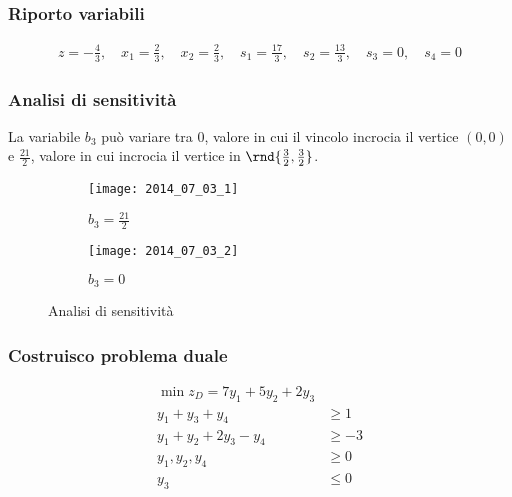 \documentclass[\main/main.tex]{subfiles}
\begin{document}
\subsubsection*{Riporto variabili}

\begin{align*}
  z = -\frac{4}{3}, \quad
  x_1 = \frac{2}{3}, \quad
  x_2 = \frac{2}{3}, \quad
  s_1 = \frac{17}{3}, \quad
  s_2 = \frac{13}{3}, \quad
  s_3 = 0, \quad
  s_4 = 0
\end{align*}
\subsubsection*{Analisi di sensitività}
La variabile $b_3$ può variare tra $0$, valore in cui il vincolo incrocia il vertice $(0,0)$ e $\frac{21}{2}$, valore in cui incrocia il vertice in $\rnd{\frac{3}{2}, \frac{3}{2}}$.

\begin{figure}
  \begin{subfigure}{0.49\textwidth}
    \texttt{[image: 2014\_07\_03\_1]}
    \caption{$b_3 = \frac{21}{2}$}
  \end{subfigure}
  \begin{subfigure}{0.49\textwidth}
    \texttt{[image: 2014\_07\_03\_2]}
    \caption{$b_3 = 0$}
  \end{subfigure}
  \caption{Analisi di sensitività}
\end{figure}

\subsubsection*{Costruisco problema duale}
\begin{align*}
  \min z_D = 7y_1 + 5y_2 + 2y_3   \\
  y_1 + y_3 + y_4       & \geq 1  \\
  y_1 + y_2 + 2y_3 -y_4 & \geq -3 \\
  y_1, y_2, y_4         & \geq 0  \\
  y_3                   & \leq 0
\end{align*}
\end{document}
